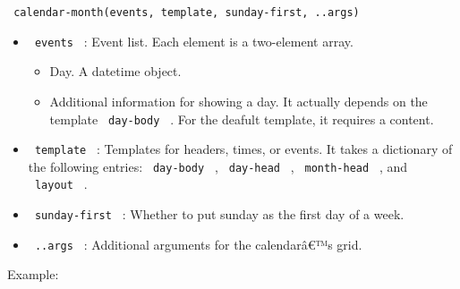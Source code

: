 \texttt{\ calendar-month(events,\ template,\ sunday-first,\ ..args)\ }

\begin{itemize}
\tightlist
\item
  \texttt{\ events\ } : Event list. Each element is a two-element array.

  \begin{itemize}
  \tightlist
  \item
    Day. A datetime object.
  \item
    Additional information for showing a day. It actually depends on the
    template \texttt{\ day-body\ } . For the deafult template, it
    requires a content.
  \end{itemize}
\item
  \texttt{\ template\ } : Templates for headers, times, or events. It
  takes a dictionary of the following entries: \texttt{\ day-body\ } ,
  \texttt{\ day-head\ } , \texttt{\ month-head\ } , and
  \texttt{\ layout\ } .
\item
  \texttt{\ sunday-first\ } : Whether to put sunday as the first day of
  a week.
\item
  \texttt{\ ..args\ } : Additional arguments for the calendarâ€™s grid.
\end{itemize}

Example:

\begin{Shaded}
\begin{Highlighting}[]
\NormalTok{)}

\NormalTok{  )}
\NormalTok{)}
\end{Highlighting}
\end{Shaded}

